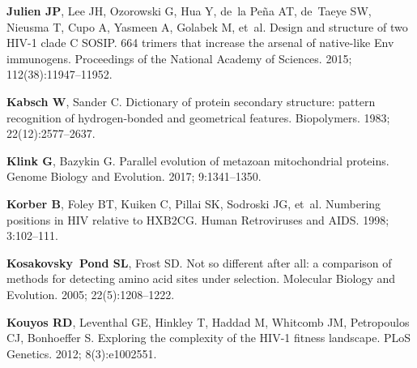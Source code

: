 \documentclass[9pt]{elife}
\begin{document}
\begin{thebibliography}{114}
\textbf{\color{eLifeMediumGrey} Julien JP}, Lee JH, Ozorowski G, Hua Y, de~la
  Pe{\~n}a AT, de~Taeye SW, Nieusma T, Cupo A, Yasmeen A, Golabek M, et~al.
\newblock Design and structure of two HIV-1 clade C SOSIP. 664 trimers that
  increase the arsenal of native-like Env immunogens.
\newblock Proceedings of the National Academy of Sciences.  2015;
  112(38):11947--11952.

\textbf{\color{eLifeMediumGrey} Kabsch W}, Sander C.
\newblock Dictionary of protein secondary structure: pattern recognition of
  hydrogen-bonded and geometrical features.
\newblock Biopolymers.  1983; 22(12):2577--2637.

\textbf{\color{eLifeMediumGrey} Klink G}, Bazykin G.
\newblock Parallel evolution of metazoan mitochondrial proteins.
\newblock Genome Biology and Evolution.  2017; 9:1341--1350.

\textbf{\color{eLifeMediumGrey} Korber B}, Foley BT, Kuiken C, Pillai SK,
  Sodroski JG, et~al.
\newblock Numbering positions in HIV relative to HXB2CG.
\newblock Human Retroviruses and AIDS.  1998; 3:102--111.

\textbf{\color{eLifeMediumGrey} Kosakovsky~Pond SL}, Frost SD.
\newblock Not so different after all: a comparison of methods for detecting
  amino acid sites under selection.
\newblock Molecular Biology and Evolution.  2005; 22(5):1208--1222.

\textbf{\color{eLifeMediumGrey} Kouyos RD}, Leventhal GE, Hinkley T, Haddad M,
  Whitcomb JM, Petropoulos CJ, Bonhoeffer S.
\newblock Exploring the complexity of the {HIV-1} fitness landscape.
\newblock PLoS Genetics.  2012; 8(3):e1002551.


\end{thebibliography}
\end{document}
